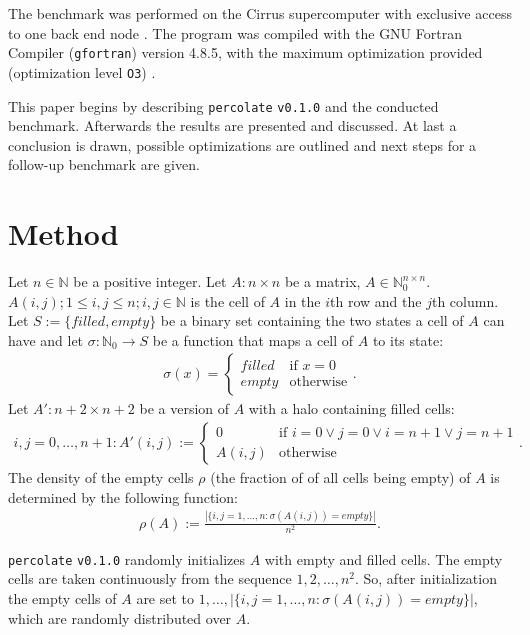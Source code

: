 \documentclass[twoside,11pt]{article}
\def\perc{\texttt{perco\-late}}
\def\v{\texttt{v0.1.0}}
\begin{document}
The benchmark was performed on the Cirrus supercomputer
with exclusive access to one back end node
\citep[see][]{cirrus}.
The program was compiled with the GNU Fortran Compiler
(\texttt{gfortran}) version 4.8.5, with the maximum
optimization provided (optimization level \texttt{O3})
\citep[see][]{gfortran}.

This paper begins by describing \perc{} \v{} and the
conducted benchmark.
Afterwards the results are presented and discussed.
At last a conclusion is drawn, possible optimizations are
outlined and next steps for a follow-up benchmark are
given.

\section{Method} %

Let $n \in \mathbb{N}$ be a positive integer.
Let $A: n \times n$ be a matrix,
$A \in \mathbb{N}_{0}^{n \times n}$.
$A(i, j); 1 \leq i, j \leq n; i, j \in \mathbb{N}$ is
the cell of $A$ in the $i$th row and the $j$th column.
Let $S := \{filled, empty\}$ be a binary set containing the
two states a cell of $A$ can have and let $\sigma:
\mathbb{N}_0 \rightarrow S$ be a function that
maps a cell of $A$ to its state:
\begin{align*}
\sigma(x) = \begin{cases}
  filled &\text{if } x = 0 \\
  empty  &\text{otherwise}
\end{cases}.
\end{align*}
Let $A': n+2 \times n+2$ be a version of $A$ with a halo
containing filled cells:
\begin{align}
  \label{eq:a'}
i,j = 0, \dots, n+1: A'(i, j) := \begin{cases}
  0 &\text{if } i=0 \lor j=0 \lor i=n+1 \lor j=n+1 \\
  A(i, j) &\text{otherwise}
\end{cases}.
\end{align}
The density of the empty cells $\rho$ (the fraction of
of all cells being empty) of $A$ is determined
by the following function:
\begin{align*}
\rho(A) := \frac{|\{i,j=1,\dots,n: \sigma(A(i,j)) = empty\}|}{n^2}.
\end{align*}

\perc{} \v{} randomly initializes $A$ with empty and
filled cells.
The empty cells are taken continuously from the sequence
$1,2,\dots,n^2$.
So, after initialization the empty cells of $A$ are
set to $1,\dots,|\{i,j=1,\dots,n:\sigma(A(i,j))=empty\}|$,
which are randomly distributed over $A$.
\end{document}
